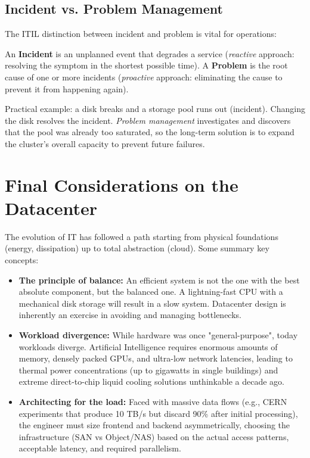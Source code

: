 \subsection{Incident vs. Problem Management}
The ITIL distinction between incident and problem is vital for operations:
\begin{definitionbox}
An \textbf{Incident} is an unplanned event that degrades a service (\textit{reactive} approach: resolving the symptom in the shortest possible time).
A \textbf{Problem} is the root cause of one or more incidents (\textit{proactive} approach: eliminating the cause to prevent it from happening again).
\end{definitionbox}
Practical example: a disk breaks and a storage pool runs out (incident). Changing the disk resolves the incident. \textit{Problem management} investigates and discovers that the pool was already too saturated, so the long-term solution is to expand the cluster's overall capacity to prevent future failures.

\section{Final Considerations on the Datacenter}
The evolution of IT has followed a path starting from physical foundations (energy, dissipation) up to total abstraction (cloud). Some summary key concepts:
\begin{itemize}
    \item \textbf{The principle of balance:} An efficient system is not the one with the best absolute component, but the balanced one. A lightning-fast CPU with a mechanical disk storage will result in a slow system. Datacenter design is inherently an exercise in avoiding and managing bottlenecks.
    \item \textbf{Workload divergence:} While hardware was once "general-purpose", today workloads diverge. Artificial Intelligence requires enormous amounts of memory, densely packed GPUs, and ultra-low network latencies, leading to thermal power concentrations (up to gigawatts in single buildings) and extreme direct-to-chip liquid cooling solutions unthinkable a decade ago.
    \item \textbf{Architecting for the load:} Faced with massive data flows (e.g., CERN experiments that produce 10 TB/s but discard 90\% after initial processing), the engineer must size frontend and backend asymmetrically, choosing the infrastructure (SAN vs Object/NAS) based on the actual access patterns, acceptable latency, and required parallelism.
\end{itemize}
